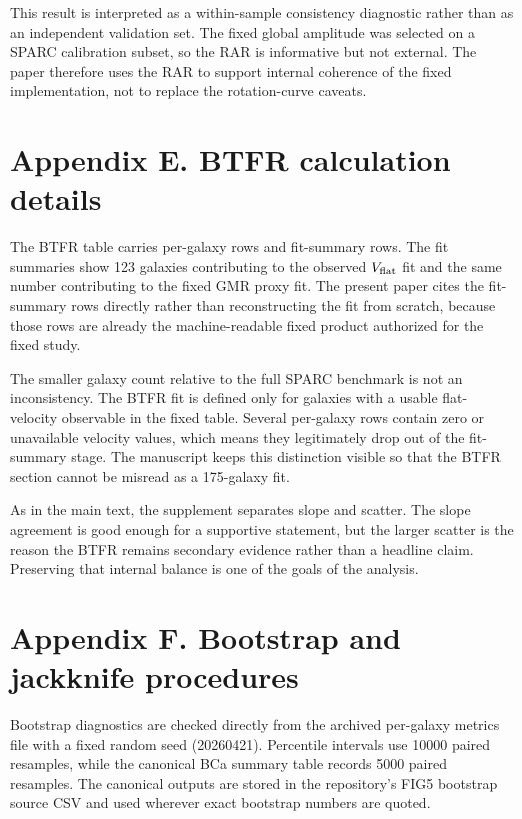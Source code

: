 \documentclass[twocolumn]{aastex701}
\begin{document}
This result is interpreted as a within-sample consistency diagnostic rather than as an independent validation set. The fixed global amplitude was selected on a SPARC calibration subset, so the RAR is informative but not external. The paper therefore uses the RAR to support internal coherence of the fixed implementation, not to replace the rotation-curve caveats.



\section{Appendix E. BTFR calculation details}

The BTFR table carries per-galaxy rows and fit-summary rows. The fit summaries show 123 galaxies contributing to the observed $V_{\rm flat}$ fit and the same number contributing to the fixed GMR proxy fit. The present paper cites the fit-summary rows directly rather than reconstructing the fit from scratch, because those rows are already the machine-readable fixed product authorized for the fixed study.

The smaller galaxy count relative to the full SPARC benchmark is not an inconsistency. The BTFR fit is defined only for galaxies with a usable flat-velocity observable in the fixed table. Several per-galaxy rows contain zero or unavailable velocity values, which means they legitimately drop out of the fit-summary stage. The manuscript keeps this distinction visible so that the BTFR section cannot be misread as a 175-galaxy fit.

As in the main text, the supplement separates slope and scatter. The slope agreement is good enough for a supportive statement, but the larger scatter is the reason the BTFR remains secondary evidence rather than a headline claim. Preserving that internal balance is one of the goals of the analysis.
\section{Appendix F. Bootstrap and jackknife procedures}

Bootstrap diagnostics are checked directly from the archived per-galaxy metrics file with a fixed random seed (20260421). Percentile intervals use 10000 paired resamples, while the canonical BCa summary table records 5000 paired resamples. The canonical outputs are stored in the repository's FIG5 bootstrap source CSV and used wherever exact bootstrap numbers are quoted.
\end{document}
